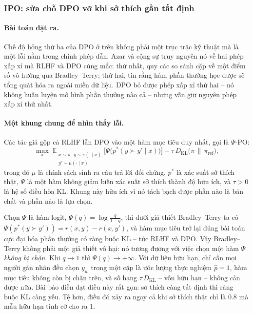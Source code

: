 \subsubsection{IPO: sửa chỗ DPO vỡ khi sở thích gần tất định}
\label{ssec:ipo}

\paragraph{Bài toán đặt ra.}
Chế độ hỏng thứ ba của DPO ở trên không phải một trục trặc kỹ thuật mà là một lỗi nằm trong chính phép dẫn. Azar và cộng sự \cite{azar2024ipo} truy nguyên nó về hai phép xấp xỉ mà RLHF và DPO cùng mắc: thứ nhất, quy các so sánh cặp về một điểm số vô hướng qua Bradley--Terry; thứ hai, tin rằng hàm phần thưởng học được sẽ tổng quát hóa ra ngoài miền dữ liệu. DPO bỏ được phép xấp xỉ thứ hai -- nó không huấn luyện mô hình phần thưởng nào cả -- nhưng vẫn giữ nguyên phép xấp xỉ thứ nhất.

\paragraph{Một khung chung để nhìn thấy lỗi.}
Các tác giả gộp cả RLHF lẫn DPO vào một hàm mục tiêu duy nhất, gọi là \( \Psi \)-PO:
\[
    \max_{\pi}\;
    \mathbb{E}_{\substack{x \sim \rho,\; y \sim \pi(\cdot \mid x) \\ y' \sim \mu(\cdot \mid x)}}
    \Big[ \Psi\big( p^{*}(y \succ y' \mid x) \big) \Big]
    - \tau\, D_{\text{KL}}\big(\pi \,\|\, \pi_{\text{ref}}\big),
\]
trong đó \( \mu \) là chính sách sinh ra câu trả lời đối chứng, \( p^{*} \) là xác suất sở thích thật, \( \Psi \) là một hàm không giảm biến xác suất sở thích thành độ hữu ích, và \( \tau > 0 \) là hệ số điều hòa KL. Khung này hữu ích vì nó tách bạch được phần nào là bản chất và phần nào là lựa chọn.

Chọn \( \Psi \) là hàm logit, \( \Psi(q) = \log\frac{q}{1-q} \), thì dưới giả thiết Bradley--Terry ta có \( \Psi(p^{*}(y \succ y')) = r(x,y) - r(x,y') \), và hàm mục tiêu trở lại đúng bài toán cực đại hóa phần thưởng có ràng buộc KL -- tức RLHF và DPO. Vậy Bradley--Terry không phải một giả thiết vô hại: nó tương đương với việc chọn một hàm \( \Psi \) \emph{không bị chặn}. Khi \( q \to 1 \) thì \( \Psi(q) \to +\infty \). Với dữ liệu hữu hạn, chỉ cần mọi người gán nhãn đều chọn \( y_w \) trong một cặp là ước lượng thực nghiệm \( \hat{p} = 1 \), hàm mục tiêu không còn bị chặn trên, và số hạng \( \tau\, D_{\text{KL}} \) -- vốn hữu hạn -- không cản được nữa. Bài báo diễn đạt điều này rất gọn: sở thích càng tất định thì ràng buộc KL càng yếu. Tệ hơn, điều đó xảy ra ngay cả khi sở thích thật chỉ là 0.8 mà mẫu hữu hạn tình cờ cho ra 1.

